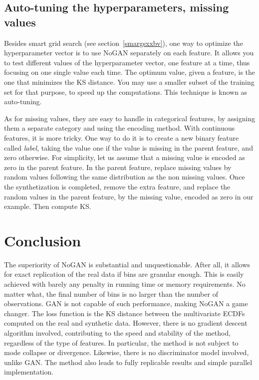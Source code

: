 \documentclass[oneside,10pt]{book}
\begin{document}
\subsection{Auto-tuning the hyperparameters, missing values}\label{attrere}

Besides \textcolor{index}{smart grid search} (see section~\ref{smargsxxbv}), one way to optimize the hyperparameter vector is to use NoGAN separately on each feature. It allows you to test different values of the hyperparameter vector, one feature at a time, thus focusing on one single value each time. The optimum value, given a feature, is the one that minimizes the KS distance. You may use a smaller subset of the training set for that purpose, to speed up the computations. This technique is known as \textcolor{index}{auto-tuning}.

As for \textcolor{index}{missing values}, they are easy to handle in categorical features, by assigning them a separate category and using the encoding method. With continuous features, it is more tricky. One way to do it is to create a new binary feature called {\em label}, taking the value one if the value is missing in
 the parent feature, and zero otherwise. For simplicity, let us assume that a missing value is encoded as zero in the parent feature. In the parent feature, replace missing values by random values following the same distribution as the non missing values. Once the synthetization is completed, remove the extra feature, and replace the random values in the parent feature, by the missing value, encoded as zero in our example. Then compute KS.









\section{Conclusion}

The superiority of NoGAN is substantial and unquestionable. After all, it allows for exact replication of the real data if bins are
granular enough. This is easily achieved with barely any penalty in running time or memory requirements.
No matter what, the final number of bins is no larger than the number of observations. GAN is not capable of such performance, making
 NoGAN a game changer. The \textcolor{index}{loss function} is the KS distance between the multivariate ECDFs computed on the real and synthetic data. However,
 there is no \textcolor{index}{gradient descent} algorithm involved, contributing to the speed and stability of the method, regardless of the type of features. In particular, the method is not subject to \textcolor{index}{mode collapse} or divergence.
 Likewise, there is no discriminator model involved, unlike GAN. The method also leads to fully replicable results and simple parallel  implementation.
\end{document}
